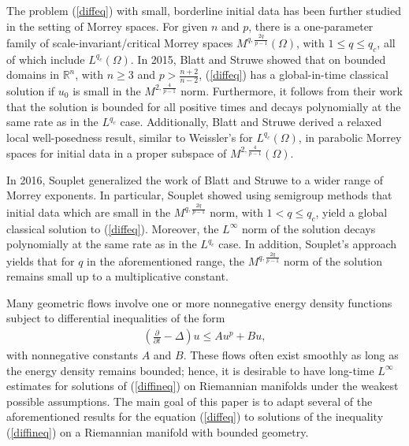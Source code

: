 \documentclass[12pt]{amsart}
\newcommand{\p}{{ \partial}}
\renewcommand{\1}{{\mathbf 1}}
\newcommand{\R}{{\mathbb R}}
\renewcommand{\p}{{\partial}}
\theoremstyle{others}
\numberwithin{equation}{section}
\begin{document}
 The problem (\ref{diffeq}) with small, borderline initial data has been further studied in the setting of Morrey spaces. For given \(n\) and \(p\), there is a one-parameter family of scale-invariant/critical Morrey spaces \(M^{q, \frac{2q}{p-1}}(\Omega)\), with \(1 \leq q \leq q_c\), all of which include \(L^{q_c}(\Omega)\).  
  In 2015, Blatt and Struwe \cite{blattstruweanalyticframework, blattstruweboundary, laneemdenMorrey} showed that on bounded %
  domains in \(\R^n\), with \(n \geq 3\) and \(p > \frac{n+2}{n-2}\), (\ref{diffeq}) has a global-in-time classical solution if \(u_0\) is small in the \(M^{2, \frac{4}{p-1}}\) norm. Furthermore, it follows from their work that the solution is bounded for all positive times and decays polynomially at the same rate as in the \(L^{q_c}\) case. Additionally, Blatt and Struwe derived a relaxed local well-posedness result, similar to Weissler's for \(L^{q_c}(\Omega)\), in parabolic Morrey spaces for initial data in a proper subspace of \(M^{2, \frac{4}{p-1}}(\Omega)\). \par
 In 2016, Souplet \cite{semilinearmorrey} generalized the work of Blatt and Struwe to a wider range of Morrey exponents. In particular, Souplet showed using semigroup methods that initial data which are small in the \(M^{q, \frac{2q}{p-1}}\) norm, with \(1 < q \leq q_c\), yield a global classical solution to (\ref{diffeq}). Moreover, the \(L^\infty\) norm of the solution decays polynomially at the same rate as in the \(L^{q_c}\) case. In addition, Souplet's approach yields that for \(q\) in the aforementioned range, the \(M^{q, \frac{2q}{p-1}}\) norm of the solution remains small up to a multiplicative constant. \par
Many geometric flows
involve one or more nonnegative energy density functions subject to differential inequalities of the form
\begin{align}\label{diffineq}
    \left( \frac{\p}{\p t} - \Delta \right) u \leq Au^p + Bu,
\end{align} with nonnegative constants \(A\) and \(B\). These flows often exist smoothly as long as the energy density remains bounded; hence, 
it is desirable to have long-time $L^\infty$ estimates for solutions of (\ref{diffineq}) on Riemannian manifolds under the weakest possible assumptions. The main goal of this paper is to adapt several of the aforementioned results for the equation (\ref{diffeq}) to solutions of the inequality (\ref{diffineq}) on a %
Riemannian manifold with bounded geometry.
\end{document}

